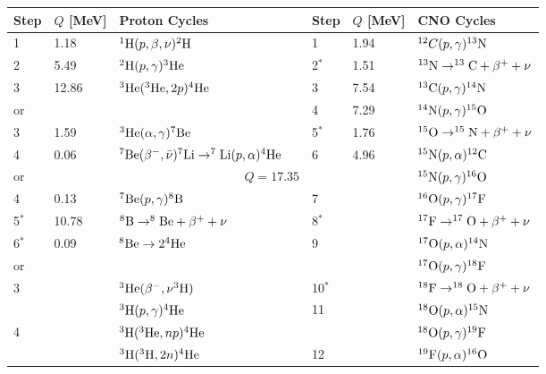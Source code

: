 \documentclass[a4paper,10pt]{article}
\begin{document}
\begin{table}[t]
\begin{tabular}{lll|lll}
\hline
Step & $Q$ [MeV] & Proton Cycles & Step & $Q$ [MeV] & CNO Cycles \\
\hline
 1     & 1.18  & $^1{\rm H}(p,\beta,\nu)^2{\rm H}$     & 1       & 1.94  & $^{12}C(p,\gamma)^{13}{\rm N}$ \\
 2     & 5.49  & $^2{\rm H}(p,\gamma)^3{\rm He}$       & 2$^*$   & 1.51  & $^{13}{\rm N}\rightarrow^{13}{\rm C}+\beta^++\nu$ \\
 3     & 12.86 & $^3{\rm He}(^3{\rm He},2p)^4{\rm He}$ & 3       & 7.54  & $^{13}{\rm C}(p,\gamma)^{14}{\rm N}$ \\
 or    &       &                                       & 4       & 7.29  & $^{14}{\rm N}(p,\gamma)^{15}{\rm O}$ \\
 3     & 1.59  & $^3{\rm He}(\alpha,\gamma)^7{\rm Be}$ & 5$^*$   & 1.76  & $^{15}{\rm O}\rightarrow^{15}{\rm N}+\beta^++\nu$ \\
 4     & 0.06  & $^7{\rm Be}(\beta^-,\bar{\nu})^7{\rm Li}\rightarrow^7{\rm Li}(p,\alpha)^4{\rm He}$ & 6     & 4.96 & $^{15}{\rm N}(p,\alpha)^{12}{\rm C}$ \\
 or    &       &         ~~~~~~~~~~~~~~~~~~~~$Q=17.35$ &         &       & $^{15}{\rm N}(p,\gamma)^{16}{\rm O}$ \\
 4     & 0.13  & $^7{\rm Be}(p,\gamma)^8{\rm B}$       & 7       &       & $^{16}{\rm O}(p,\gamma)^{17}{\rm F}$ \\
 5$^*$ & 10.78 & $^8{\rm B}\rightarrow^8{\rm Be}+\beta^++\nu $    & 8$^*$ &  & $^{17}{\rm F}\rightarrow^{17}{\rm O}+\beta^++\nu$ \\
 6$^*$ & 0.09  & $^8{\rm Be}\rightarrow2^4{\rm He}$    & 9       &       & $^{17}{\rm O}(p,\alpha)^{14}{\rm N}$ \\
 or    &       &                                       &         &       & $^{17}{\rm O}(p,\gamma)^{18}{\rm F}$ \\
 3     &       & $^3{\rm He}(\beta^-,\nu^3{\rm H})$    & 10$^*$  &       & $^{18}{\rm F}\rightarrow^{18}{\rm O}+\beta^++\nu$ \\
       &       & $^3{\rm H}(p,\gamma)^4{\rm He}$       & 11      &       & $^{18}{\rm O}(p,\alpha)^{15}{\rm N}$ \\
 4     &       & $^3{\rm H}(^3{\rm He},np)^4{\rm He}$  &         &       & $^{18}{\rm O}(p,\gamma)^{19}{\rm F}$ \\
       &       & $^3{\rm H}(^3{\rm H},2n)^4{\rm He}$   & 12      &       & $^{19}{\rm F}(p,\alpha)^{16}{\rm O}$ \\

\end{tabular}
\end{table}
\end{document}
